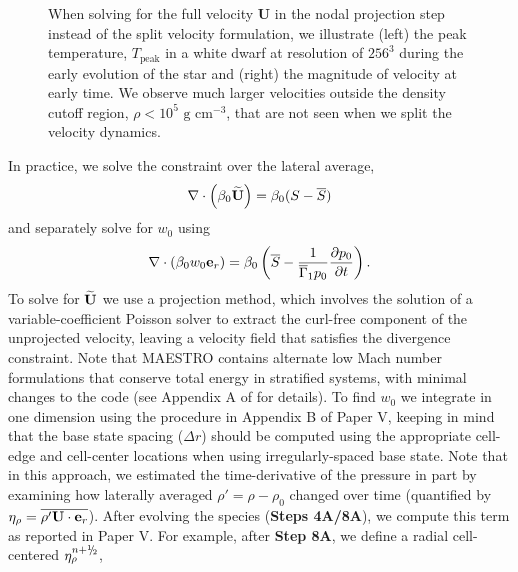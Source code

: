 \documentclass{aastex62}
\newcommand{\sfrac}[2]{\mathchoice
  {\kern0em\raise.5ex\hbox{\the\scriptfont0 #1}\kern-.15em/
   \kern-.15em\lower.25ex\hbox{\the\scriptfont0 #2}}
  {\kern0em\raise.5ex\hbox{\the\scriptfont0 #1}\kern-.15em/
   \kern-.15em\lower.25ex\hbox{\the\scriptfont0 #2}}
  {\kern0em\raise.5ex\hbox{\the\scriptscriptfont0 #1}\kern-.2em/
   \kern-.15em\lower.25ex\hbox{\the\scriptscriptfont0 #2}}
  {#1\!/#2}}
\newcommand{\myhalf}{\sfrac{1}{2}}
\newcommand{\eb}{{\bf{e}}}
\newcommand{\Ub}{{\bf{U}}}
\newcommand{\Ubt}{\widetilde{\Ub}}
\newcommand{\etarho}{\eta_\rho}
\newcommand{\gammaonebar}{\overline{\Gamma}_1}
\newcommand{\nph}{{n+\myhalf}}
\begin{document}
\begin{figure}[htb]
\begin{center}
\begin{tabular}{l c}
\end{tabular}
\caption{\label{fig:wdconvect_splitU} When solving for the full velocity $\mathbf{U}$ in the nodal projection step instead of the split velocity 
  formulation, we illustrate
  (left) the peak temperature, $T_{\text{peak}}$ in a white dwarf at resolution of $256^3$ during the early evolution of the star and
  (right) the magnitude of velocity at early time. We observe much larger velocities outside the density cutoff region, $\rho < 10^5 \text{ g cm}^{-3}$, 
  that are not seen when we split the velocity dynamics.}
\end{center}
\end{figure}

In practice, we solve the constraint over the lateral average,
\begin{equation}
\nabla\cdot\left(\beta_0\Ubt\right) = \beta_0(S-\overline{S})
\end{equation}
and separately solve for $w_0$ using 
\begin{equation}
\nabla\cdot(\beta_0w_0\eb_r) = \beta_0\left(\overline{S} - \frac{1}{\gammaonebar p_0}\frac{\partial p_0}{\partial t}\right).
\end{equation}
To solve for $\Ubt$ we use a projection method, which involves the solution of a variable-coefficient Poisson solver to extract the curl-free component of the unprojected velocity, leaving a velocity field that satisfies the divergence constraint.
Note that MAESTRO contains alternate low Mach number formulations that conserve total energy in stratified systems, with minimal changes to the code (see Appendix A of \cite{subChandra_II} for details).
To find $w_0$ we integrate in one dimension using the procedure in Appendix B of Paper V, keeping in mind that the base state spacing ($\Delta r$) should be computed using the appropriate cell-edge and cell-center locations when using irregularly-spaced base state.
Note that in this approach, we estimated the time-derivative of the pressure in part by examining how laterally averaged $\rho'=\rho-\rho_0$ changed over time (quantified by $\eta_\rho = \overline{\rho'\Ub\cdot\eb_r}$).  After evolving the species ({\bf Steps 4A/8A}), we compute this term as reported in Paper V. For example, after {\bf Step 8A}, we define a radial cell-centered $\etarho^{\nph}$, 
\end{document}
